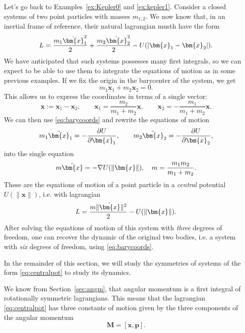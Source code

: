 \documentclass[english,fontsize=11pt,paper=a5,oneside]{scrbook}
\newcommand{\bx}{\bm{x}}
\newcommand{\bp}{\bm{p}}
\theoremstyle{definition}
\newenvironment{example}
  {\pushQED{\qed}\renewcommand{\qedsymbol}{$\lozenge$}\examplex}
  {\popQED\endexamplex}
\begin{document}
\begin{example}[The two-body problem]\label{ex:kepler2}
Let's go back to Examples~\ref{ex:Kepler0} and \ref{ex:kepler1}.
Consider a closed systems of two point particles with masses $m_{1,2}$.
We now know that, in an inertial frame of reference, their natural lagrangian musth have the form
\begin{equation}
    L = \frac{m_1 \dot\bx_1^2}{2} + \frac{m_2 \dot\bx_2^2}{2} - U(|\bx_1 - \bx_2|).
\end{equation}
We have anticipated that such systems possesses many first integrals, so we can expect to be able to use them to integrate the equations of motion as in some previous examples.
If we fix the origin in the barycenter of the system, we get
\begin{equation}
    m_1 \bx_1 + m_2 \bx_2 = 0.
\end{equation}
This allows us to express the coordinates in terms of a single vector:
\begin{equation}\label{eq:barycoords}
    \bx := \bx_1 - \bx_2, \qquad
    \bx_1 = \frac{m_2}{m_1 + m_2} \bx, \qquad
    \bx_2 = -\frac{m_1}{m_1 + m_2} \bx.
\end{equation}
We can then use \eqref{eq:barycoords} and rewrite the equations of motion
\begin{equation}
    m_1 \ddot \bx_1 = -\frac{\partial U}{\partial \bx_1}, \qquad m_2 \ddot \bx_2 = -\frac{\partial U}{\partial \bx_2},
\end{equation}
into the single equation
\begin{equation}
    m \ddot \bx = -\nabla U(\|\bx\|), \quad m = \frac{m_1m_2}{m_1+m_2}.
\end{equation}
These are the equations of motion of a point particle in a \emph{central} potential $U(\|\bx\|)$, i.e. with lagrangian
\begin{equation}\label{eq:centralpot}
    L = \frac{m \|\dot\bx\|^2}{2} - U(\|\bx\|).
\end{equation}
After solving the equations of motion of this system with \emph{three} degrees of freedom, one can recover the dynamic of the original two bodies, i.e. a system with \emph{six} degrees of freedom, using \eqref{eq:barycoords}.
\end{example}

In the remainder of this section, we will study the symmetries of systems of the form \eqref{eq:centralpot} to study its dynamics.

We know from Section~\ref{sec:angm}, that angular momentum is a first integral of rotationally symmetric lagrangians.
This means that the lagrangian \eqref{eq:centralpot} has three constants of motion given by the three components of the angular momentum
\begin{equation}
    \bm{M} = [\bx, \bp].
\end{equation}
\end{document}
